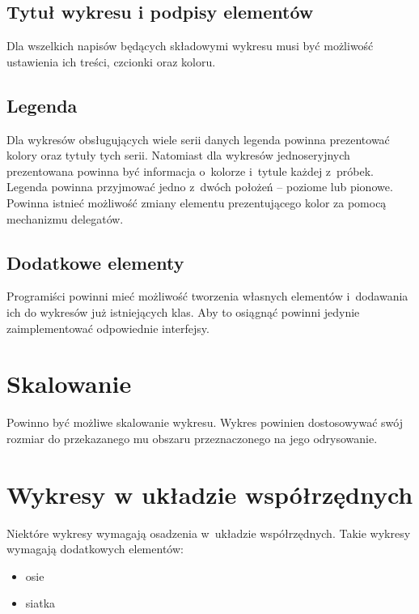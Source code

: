 \subsection{Tytuł wykresu i podpisy elementów}
Dla wszelkich napisów będących składowymi wykresu musi być możliwość ustawienia ich treści, czcionki oraz koloru.

\subsection{Legenda}
Dla wykresów obsługujących wiele serii danych legenda powinna prezentować kolory oraz tytuły tych serii. Natomiast dla wykresów jednoseryjnych prezentowana powinna być informacja o~kolorze i~tytule każdej z~próbek. Legenda powinna przyjmować jedno z~dwóch położeń -- poziome lub pionowe. Powinna istnieć możliwość zmiany elementu prezentującego kolor za pomocą mechanizmu delegatów.

\subsection{Dodatkowe elementy}
Programiści powinni mieć możliwość tworzenia własnych elementów i~dodawania ich do wykresów już istniejących klas. Aby to osiągnąć powinni jedynie zaimplementować odpowiednie interfejsy.


\section{Skalowanie}
Powinno być możliwe skalowanie wykresu. Wykres powinien dostosowywać swój rozmiar do przekazanego mu obszaru przeznaczonego na jego odrysowanie.



\section{Wykresy w układzie współrzędnych}
Niektóre wykresy wymagają osadzenia w~układzie współrzędnych. Takie wykresy wymagają dodatkowych elementów:

\begin{itemize}
\item{osie}
\item{siatka}
\end{itemize}

